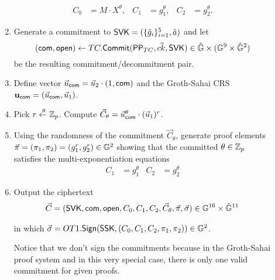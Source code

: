 \begin{description}
\begin{enumerate}
    \begin{align*}
      C_0 &= M\cdot X^{\theta}, & C_1 &= g_1^{\theta}, & C_2 &= g_2^{\theta}.
    \end{align*}
  \item Generate a commitment to $\mathsf{SVK} = (\{\hat{g}_i\}_{i =1}^5, \hat{a})$ and let 
    $$(\mathsf{com}, \mathsf{open}) \gets TC.{\mathsf{Commit}}(\mathsf{PP}_{TC}, \vec{ck}, \mathsf{SVK}) \in \hat{\mathbb{G}} \times (\mathbb{G}^9 \times \hat{\mathbb{G}}^2)$$
    be the resulting commitment/decommitment pair.
  \item Define vector $\vec{u}_{\mathsf{com}} = \vec{u}_2\cdot (1, \mathsf{com})$ and the Groth-Sahai CRS $\mathbf{u}_{\mathsf{com}}=(\vec{u}_{\mathsf{com}},\vec{u}_1)$. 
  \item Pick $r \stackrel{{\scriptscriptstyle \mkern4mu R}}{\gets} \mathbb{Z}_p$. Compute $\vec{C}_{\theta} = \vec{u}_{\mathsf{com}}^{\theta} \cdot (\vec{u}_1)^r$.
  \item Using the randomness of the commitment $\vec{C}_{\theta}$, generate  proof elements $\vec{\pi}=(\pi_1,\pi_2)=(g_1^r,g_2^r) \in \mathbb{G}^2$ showing that the committed $\theta \in \mathbb{Z}_p$ satisfies the multi-exponentiation equations
    \begin{align*}
      C_1 &= g_1^{\theta} & C_2 &= g_2^{\theta}
    \end{align*}
  \item Output the ciphertext
    \begin{align*}
      \vec{C} = (\mathsf{SVK}, \mathsf{com}, \mathsf{open}, C_0, C_1, C_2, \vec{C}_{\theta}, \vec{\pi}, \vec{\sigma}) \in \mathbb{G}^{16} \times \hat{\mathbb{G}}^{11}
    \end{align*}
    
    
    in which $\vec{\sigma} = OT1.{\mathsf{Sign}}(\mathsf{SSK}, (C_0, C_1, C_2, {\pi}_1,\pi_2)) \in \mathbb{G}^2$.

    Notice that we don't sign the commitments because in the Groth-Sahai proof system and in this very special case, there is only one valid commitment for given proofs.
    
  \end{enumerate}
  

\end{description}
